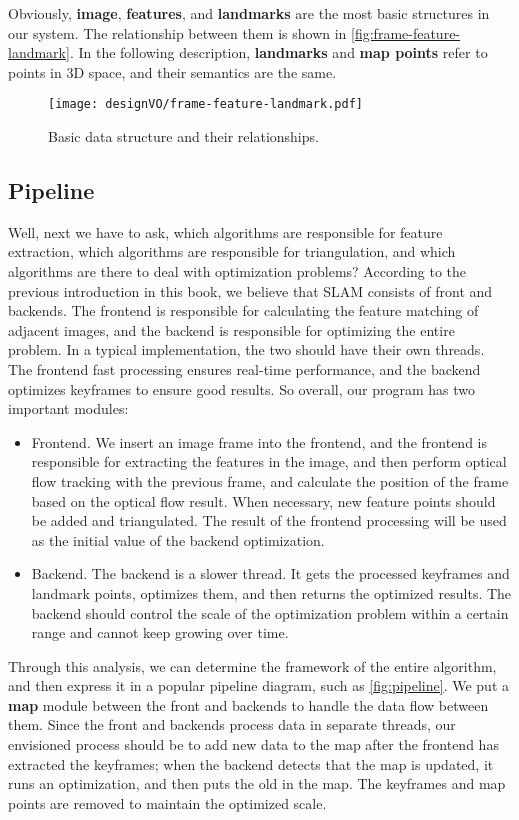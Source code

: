 Obviously, \textbf{image}, \textbf{features}, and \textbf{landmarks} are the most basic structures in our system. The relationship between them is shown in \autoref{fig:frame-feature-landmark}. In the following description, \textbf{landmarks} and \textbf{map points} refer to points in 3D space, and their semantics are the same.

\begin{figure}[!htp]
	\centering
	\texttt{[image: designVO/frame-feature-landmark.pdf]}
	\caption{Basic data structure and their relationships.}
	\label{fig:frame-feature-landmark}
\end{figure}

\subsection{Pipeline}
Well, next we have to ask, which algorithms are responsible for feature extraction, which algorithms are responsible for triangulation, and which algorithms are there to deal with optimization problems? According to the previous introduction in this book, we believe that SLAM consists of front and backends. The frontend is responsible for calculating the feature matching of adjacent images, and the backend is responsible for optimizing the entire problem. In a typical implementation, the two should have their own threads. The frontend fast processing ensures real-time performance, and the backend optimizes keyframes to ensure good results. So overall, our program has two important modules:

\begin{itemize}
	\item Frontend. We insert an image frame into the frontend, and the frontend is responsible for extracting the features in the image, and then perform optical flow tracking with the previous frame, and calculate the position of the frame based on the optical flow result. When necessary, new feature points should be added and triangulated. The result of the frontend processing will be used as the initial value of the backend optimization.
	\item Backend. The backend is a slower thread. It gets the processed keyframes and landmark points, optimizes them, and then returns the optimized results. The backend should control the scale of the optimization problem within a certain range and cannot keep growing over time.
\end{itemize}

Through this analysis, we can determine the framework of the entire algorithm, and then express it in a popular pipeline diagram, such as \autoref{fig:pipeline}. We put a \textbf{map} module between the front and backends to handle the data flow between them. Since the front and backends process data in separate threads, our envisioned process should be to add new data to the map after the frontend has extracted the keyframes; when the backend detects that the map is updated, it runs an optimization, and then puts the old in the map. The keyframes and map points are removed to maintain the optimized scale.

